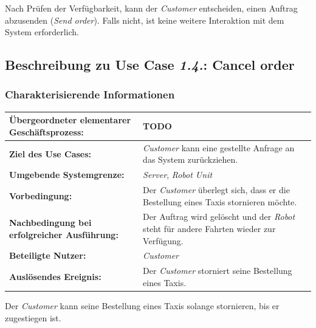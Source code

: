				Nach Prüfen der Verfügbarkeit, kann der \emph{Customer} entscheiden, einen Auftrag abzusenden (\emph{Send order}). Falls nicht, ist keine weitere Interaktion mit dem System erforderlich.
				
				
				\pagebreak
		
			\subsection*{Beschreibung zu Use Case \emph{1.4.}: Cancel order}
				\subsubsection*{Charakterisierende Informationen}
				
				\begin{table}[H]
					\centering
					\begin{tabularx}{\textwidth}{|p{5cm}|X|}
						\hline
						\textbf{Übergeordneter elementarer Geschäftsprozess:} & TODO  \\ \hline
						\textbf{Ziel des Use Cases:} & \emph{Customer} kann eine gestellte Anfrage an das System zurückziehen. \\ \hline
						\textbf{Umgebende Systemgrenze:} & \emph{Server}, \emph{Robot Unit} \\ \hline
						\textbf{Vorbedingung:} & Der \emph{Customer} überlegt sich, dass er die Bestellung eines Taxis stornieren möchte. \\ \hline
						\textbf{Nachbedingung bei erfolgreicher Ausführung:} & Der Auftrag wird gelöscht und der \emph{Robot} steht für andere Fahrten wieder zur Verfügung. \\ \hline
						\textbf{Beteiligte Nutzer:} & \emph{Customer} \\ \hline
						\textbf{Auslösendes Ereignis:} & Der \emph{Customer} storniert seine Bestellung eines Taxis. \\
						\hline
					\end{tabularx}
				\end{table}
				
				Der \emph{Customer} kann seine Bestellung eines Taxis solange stornieren, bis er zugestiegen ist.
				
			
